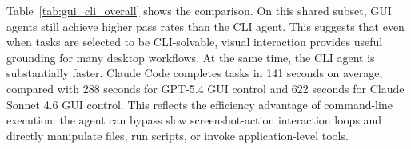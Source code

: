 \documentclass{llmxive}
\begin{document}
\begin{table}[t]
\centering
\setlength{\tabcolsep}{3pt}
\vspace{-0.5em}



\caption{Overall GUI\textendash CLI pass-rate and execution-time (per task) comparison. For the CLI Agent, we use Claude Code (v2.1.129).}
\label{tab:gui_cli_overall}
\end{table}
Table~\ref{tab:gui_cli_overall} shows the comparison. On this shared subset,
GUI agents still achieve higher pass rates than the CLI agent. This suggests that even when tasks are selected to be CLI-solvable, visual interaction provides useful grounding for many desktop workflows. At the same time, the CLI agent is substantially faster. Claude Code completes
tasks in 141 seconds on average, compared with 288 seconds for GPT-5.4 GUI
control and 622 seconds for Claude Sonnet 4.6 GUI control. This reflects the efficiency advantage of command-line
execution: the agent can bypass slow screenshot-action interaction loops and directly manipulate files, run scripts, or invoke application-level tools.
\end{document}
